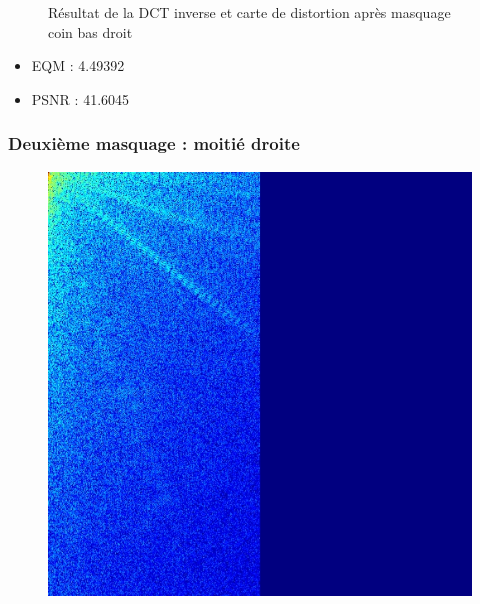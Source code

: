 \documentclass[12pt]{report}
\begin{document}
\begin{figure}[H]
\begin{center}
\caption{Résultat de la DCT inverse et carte de distortion après masquage coin bas droit}
\end{center}
\end{figure}

\begin{itemize}
\item EQM : 4.49392
\item PSNR : 41.6045
\end{itemize}

\subsubsection{Deuxième masquage : moitié droite}


\begin{figure}[H]
\begin{center}
\includegraphics[scale=0.25]{../ImageRes/dct_masked1_0.jpg} 

\end{center}
\end{figure}
\end{document}

